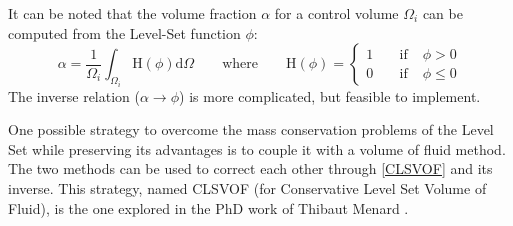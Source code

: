 \documentclass[11pt, a4paper, oneside, openany]{book}
\begin{document}
It can be noted that the volume fraction $\alpha$ for a control volume $\Omega_{i}$ can be computed from the Level-Set function $\phi$:
\begin{equation*}
	\alpha=\dfrac{1}{\Omega_{i}}\int_{\Omega_{i}}\mathrm{H}\left(\phi\right)\mathrm{d}\Omega\qquad\mathrm{where}\qquad\mathrm{H}\left(\phi\right)=\left\{\begin{array}{rccl}
	1&\;&\mathrm{if}\;&\phi>0\\
	0&\;&\mathrm{if}\;&\phi\leq 0
	\end{array}\right.\label{CLSVOF}
\end{equation*}
The inverse relation ($\alpha\rightarrow\phi$) is more complicated, but feasible to implement.\par
One possible strategy to overcome the mass conservation problems of the Level Set while preserving its advantages is to couple it with a volume of fluid method. The two methods can be used to correct each other through \eqref{CLSVOF} and its inverse. This strategy, named CLSVOF (for Conservative Level Set Volume of Fluid), is the one explored in the PhD work of Thibaut Menard \cite{Menard2007}. 
\end{document}

